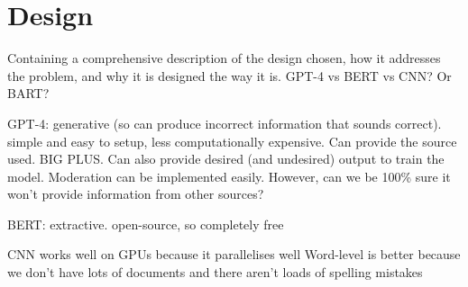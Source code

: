 \chapter{Design}

Containing a comprehensive description of the design chosen, how it addresses the problem, and why it is designed the way it is. GPT-4 vs BERT vs CNN? Or BART?

GPT-4: generative (so can produce incorrect information that sounds correct). simple and easy to setup, less computationally expensive. Can provide the source used. BIG PLUS. Can also provide desired (and undesired) output to train the model. Moderation can be implemented easily. However, can we be 100\% sure it won't provide information from other sources? 

BERT: extractive. open-source, so completely free


CNN works well on GPUs because it parallelises well
Word-level is better because we don't have lots of documents and there aren't loads of spelling mistakes





